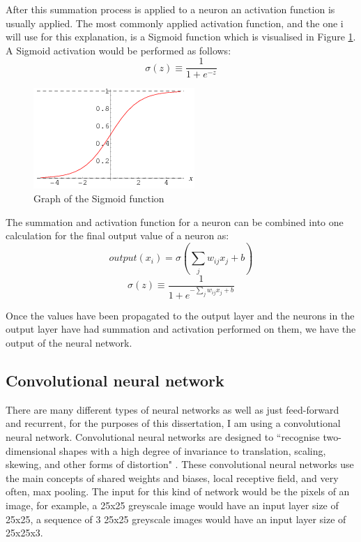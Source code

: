\documentclass[10pt]{article}
\begin{document}
		After this summation process is applied to a neuron an activation function is usually applied. The most commonly applied activation function, and the one i will use for this explanation, is a Sigmoid function which is visualised in Figure \ref{sigmoid}. A Sigmoid activation would be performed as follows:\\
		\begin{equation}
			\sigma(z) \equiv \frac{1}{1+e^{-z}}
		\end{equation}
		
		\begin{figure}[h]			
			\includegraphics[scale=0.75]{img/sigmoid}
			\centering
			\caption{Graph of the Sigmoid function \cite{sigGraph}}
			\label{sigmoid}
		\end{figure}
		
		The summation and activation function for a neuron can be combined into one calculation for the final output value of a neuron as:\\
		\begin{equation}
			output(x_i) = \sigma (\sum_j w_{ij} x_{j} + b)
		\end{equation}	
		\begin{equation}
			\sigma(z) \equiv \frac{1}{1+e^{-\sum_j w_{ij} x_{j} + b}}
		\end{equation}
		
		Once the values have been propagated to the output layer and the neurons in the output layer have had summation and activation performed on them, we have the output of the neural network.\\
		
		\medskip
		
		\subsection{Convolutional neural network}
		
		 There are many different types of neural networks as well as just feed-forward and recurrent, for the purposes of this dissertation, I am using a convolutional neural network. Convolutional neural networks are designed to ``recognise two-dimensional shapes with a high degree of invariance to translation, scaling, skewing, and other forms of distortion" \cite{nncomp}. These convolutional neural networks use the main concepts of shared weights and biases, local receptive field, and very often, max pooling. The input for this kind of network would be the pixels of an image, for example, a 25x25 greyscale image would have an input layer size of 25x25, a sequence of 3 25x25 greyscale images would have an input layer size of 25x25x3.\\
		 
\end{document}
